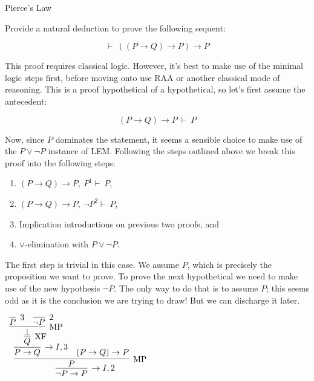 \documentclass{book}
\begin{document}
    \begin{eg}{Pierce's Law}

        Provide a natural deduction to prove the following sequent: 

        $$ \vdash \ ((P \to Q) \to P) \to P$$
        
        This proof requires classical logic. However, it's best to make use of the minimal logic steps first, before moving onto use RAA or another classical mode of reasoning. This is a proof hypothetical of a hypothetical, so let's first assume the antecedent:

        $$(P \to Q) \to P \ \vdash \ P$$
        
        Now, since $P$ dominates the statement, it seems a sensible choice to make use of the $P \lor \lnot P$ instance of LEM. Following the steps outlined above we break this proof into the following steps: 

            \begin{enumerate}
                \item $(P \to Q) \to P, \ P^{1} \vdash \ P$,
                \item $(P \to Q) \to P, \ \lnot P^{2} \vdash \ P$,
                \item Implication introductions on previous two proofs, and
                \item $\lor$-elimination with $P \lor \lnot P$. 
            \end{enumerate}
        
        The first step is trivial in this case. We assume $P$, which is precisely the proposition we want to prove. To prove the next hypothetical we need to make use of the new hypothesis $\lnot P$. The only way to do that is to assume $P$; this seems odd as it is the conclusion we are trying to draw! But we can discharge it later. 
        
        \begin{center}
            $\begin{array}{c}
                \infer[\to I,2]{\lnot P \to P}
                    {\infer[\MP]{P}
                        {\infer[\to I,3]{P \to Q}
                            {\infer[\XF]{Q}
                                {\infer[\MP]{\bot}
                                    {\infer[3]{P}{}
                                    &
                                    \infer[2]{\lnot P}{}}}}
                        &
                        (P \to Q) \to P}}
            \end{array}$
        \end{center}
        

\end{eg}
\end{document}
